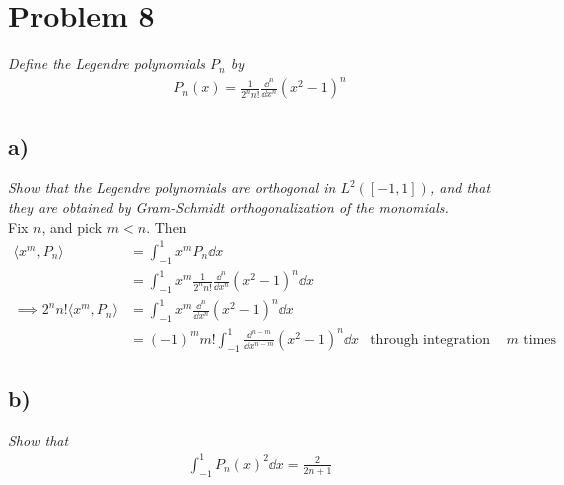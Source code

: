 \documentclass[12pt]{article}
\theoremstyle{plain}
\begin{document}
\section*{Problem 8}
\emph{Define the Legendre polynomials $P_n$ by}
\begin{align*}
    P_n(x) = \frac{1}{2^n n!}\frac{\dd^n}{\dd x^n}(x^2 - 1)^n
\end{align*}

\subsection*{ a)}
\emph{Show that the Legendre polynomials are orthogonal in $L^2([-1,1])$, and that they are obtained by Gram-Schmidt orthogonalization of the monomials.} \\

Fix $n$, and pick $m < n$.  Then
\begin{align*}
    \langle x^m, P_n \rangle &= \int_{-1}^1 x^m P_n \dd x \\
    &= \int_{-1}^1 x^m \frac{1}{2^n n!} \frac{\dd^n}{\dd x^n} (x^2 - 1)^n \dd x \\
    \implies 2^n n! \langle x^m, P_n \rangle &= \int_{-1}^1 x^m\frac{\dd^n}{\dd x^n}(x^2 - 1)^n \dd x \\
    &= (-1)^m m! \int_{-1}^1\frac{\dd^{n-m}}{\dd x^{n-m}} (x^2 - 1)^n \dd x & \text{through integration by parts $m$ times}
\end{align*}

\subsection*{ b)}
\emph{Show that}
\begin{align*}
    \int_{-1}^1 P_n(x)^2\dd x = \frac{2}{2n + 1}
\end{align*}
\end{document}
